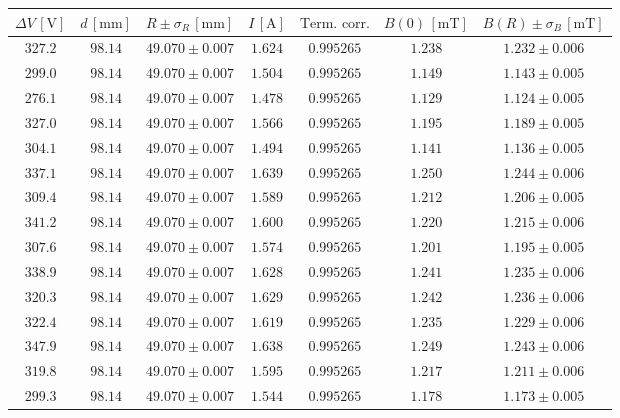 \documentclass[]{article}
\begin{document}
\begin{table}[H]
    \centering

\begin{tabular}{||c|c|c|c|c|c|c||}
    \hline
    $\Delta V\, [\text{V}] $ & $d\, [\text{mm}] $ & $R \pm \sigma_R\, [\text{mm}] $ & $I\, [\text{A}] $ & $\text{Term. corr.}$ & $B(0)\, [\text{mT}] $ & $B(R) \pm \sigma_B\, [\text{mT}] $ \\
    \hline\hline

    $327.2$ & $98.14$ & $49.070 \pm 0.007$ & $1.624$ & $0.995265$ & $1.238$ & $1.232 \pm 0.006$ \\\hline
    $299.0$ & $98.14$ & $49.070 \pm 0.007$ & $1.504$ & $0.995265$ & $1.149$ & $1.143 \pm 0.005$ \\\hline
    $276.1$ & $98.14$ & $49.070 \pm 0.007$ & $1.478$ & $0.995265$ & $1.129$ & $1.124 \pm 0.005$ \\\hline
    $327.0$ & $98.14$ & $49.070 \pm 0.007$ & $1.566$ & $0.995265$ & $1.195$ & $1.189 \pm 0.005$ \\\hline
    $304.1$ & $98.14$ & $49.070 \pm 0.007$ & $1.494$ & $0.995265$ & $1.141$ & $1.136 \pm 0.005$ \\\hline
    $337.1$ & $98.14$ & $49.070 \pm 0.007$ & $1.639$ & $0.995265$ & $1.250$ & $1.244 \pm 0.006$ \\\hline
    $309.4$ & $98.14$ & $49.070 \pm 0.007$ & $1.589$ & $0.995265$ & $1.212$ & $1.206 \pm 0.005$ \\\hline
    $341.2$ & $98.14$ & $49.070 \pm 0.007$ & $1.600$ & $0.995265$ & $1.220$ & $1.215 \pm 0.006$ \\\hline
    $307.6$ & $98.14$ & $49.070 \pm 0.007$ & $1.574$ & $0.995265$ & $1.201$ & $1.195 \pm 0.005$ \\\hline
    $338.9$ & $98.14$ & $49.070 \pm 0.007$ & $1.628$ & $0.995265$ & $1.241$ & $1.235 \pm 0.006$ \\\hline
    $320.3$ & $98.14$ & $49.070 \pm 0.007$ & $1.629$ & $0.995265$ & $1.242$ & $1.236 \pm 0.006$ \\\hline
    $322.4$ & $98.14$ & $49.070 \pm 0.007$ & $1.619$ & $0.995265$ & $1.235$ & $1.229 \pm 0.006$ \\\hline
    $347.9$ & $98.14$ & $49.070 \pm 0.007$ & $1.638$ & $0.995265$ & $1.249$ & $1.243 \pm 0.006$ \\\hline
    $319.8$ & $98.14$ & $49.070 \pm 0.007$ & $1.595$ & $0.995265$ & $1.217$ & $1.211 \pm 0.006$ \\\hline
    $299.3$ & $98.14$ & $49.070 \pm 0.007$ & $1.544$ & $0.995265$ & $1.178$ & $1.173 \pm 0.005$ \\\hline

\end{tabular}
\end{table}
\end{document}
